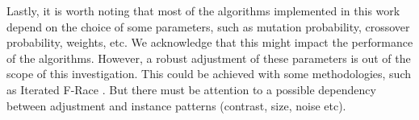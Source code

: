 		Lastly, it is worth noting that most of the algorithms implemented in this work depend on the choice of some parameters, such as mutation probability, crossover probability, weights, etc. We acknowledge that this might impact the performance of the algorithms. However, a robust adjustment of these parameters is out of the scope of this investigation. This could be achieved with some methodologies, such as Iterated F-Race \citep{birattari2010frace}. But there must be attention to a possible dependency between adjustment and instance patterns (contrast, size, noise etc).
		
		